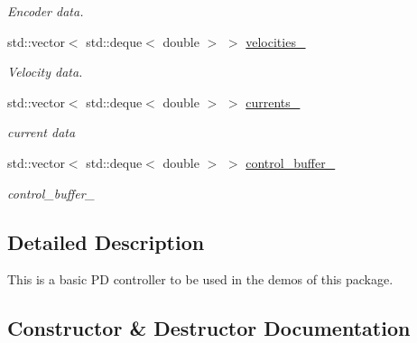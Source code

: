 \begin{DoxyCompactItemize}
\begin{DoxyCompactList}\small\item\em Encoder data. \end{DoxyCompactList}\item 
std\+::vector$<$ std\+::deque$<$ double $>$ $>$ \hyperlink{classblmc__drivers_1_1SineTorqueControl_a93eed363c979a64cfe93fb19916c3a75}{velocities\+\_\+}\hypertarget{classblmc__drivers_1_1SineTorqueControl_a93eed363c979a64cfe93fb19916c3a75}{}\label{classblmc__drivers_1_1SineTorqueControl_a93eed363c979a64cfe93fb19916c3a75}

\begin{DoxyCompactList}\small\item\em Velocity data. \end{DoxyCompactList}\item 
std\+::vector$<$ std\+::deque$<$ double $>$ $>$ \hyperlink{classblmc__drivers_1_1SineTorqueControl_a1519f05faec9972e15f48b3084debbc2}{currents\+\_\+}\hypertarget{classblmc__drivers_1_1SineTorqueControl_a1519f05faec9972e15f48b3084debbc2}{}\label{classblmc__drivers_1_1SineTorqueControl_a1519f05faec9972e15f48b3084debbc2}

\begin{DoxyCompactList}\small\item\em current data \end{DoxyCompactList}\item 
std\+::vector$<$ std\+::deque$<$ double $>$ $>$ \hyperlink{classblmc__drivers_1_1SineTorqueControl_a41969250f8847160f590a688bdf1e026}{control\+\_\+buffer\+\_\+}\hypertarget{classblmc__drivers_1_1SineTorqueControl_a41969250f8847160f590a688bdf1e026}{}\label{classblmc__drivers_1_1SineTorqueControl_a41969250f8847160f590a688bdf1e026}

\begin{DoxyCompactList}\small\item\em control\+\_\+buffer\+\_\+ \end{DoxyCompactList}\end{DoxyCompactItemize}


\subsection{Detailed Description}
This is a basic PD controller to be used in the demos of this package. 

\subsection{Constructor \& Destructor Documentation}
